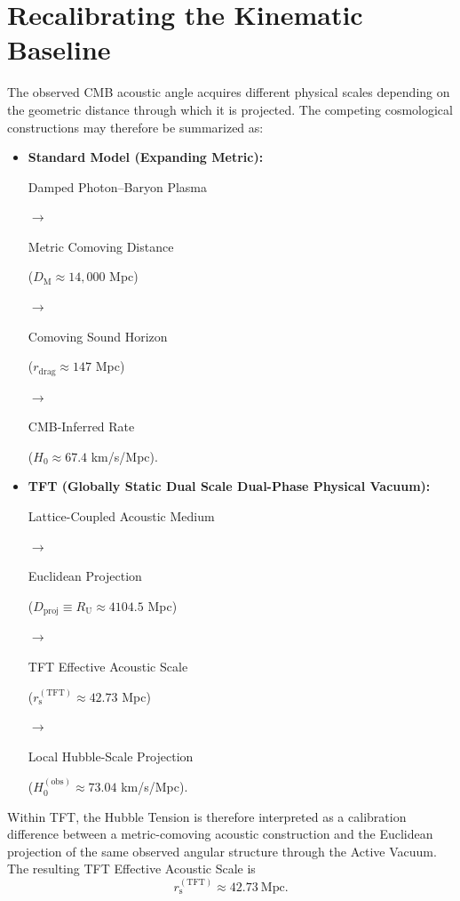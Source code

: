 \section{Recalibrating the Kinematic Baseline}
\label{sec:recalibrating_kinematic_baseline}

The observed CMB acoustic angle acquires different physical scales depending on the geometric distance through which it is projected. The competing cosmological constructions may therefore be summarized as:

\begin{itemize}

    \item \textbf{Standard Model (Expanding Metric):}

    Damped Photon--Baryon Plasma

    $\to$

    Metric Comoving Distance

    ($D_{\mathrm M} \approx 14{,}000$ Mpc)

    $\to$

    Comoving Sound Horizon

    ($r_{\mathrm{drag}} \approx 147$ Mpc)

    $\to$

    CMB-Inferred Rate

    ($H_0 \approx 67.4$ km/s/Mpc).

    \item \textbf{TFT (Globally Static Dual Scale Dual-Phase Physical Vacuum):}

    Lattice-Coupled Acoustic Medium

    $\to$

    Euclidean Projection

    ($D_{\mathrm{proj}}\equiv R_{\mathrm U}\approx4104.5$ Mpc)

    $\to$

    TFT Effective Acoustic Scale

    ($r_{\mathrm s}^{(\mathrm{TFT})}\approx42.73$ Mpc)

    $\to$

    Local Hubble-Scale Projection

    ($H_0^{(\mathrm{obs})}\approx73.04$ km/s/Mpc).

\end{itemize}

Within TFT, the Hubble Tension is therefore interpreted as a calibration difference between a metric-comoving acoustic construction and the Euclidean projection of the same observed angular structure through the Active Vacuum. The resulting TFT Effective Acoustic Scale is
\begin{equation}
    r_{\mathrm s}^{(\mathrm{TFT})}
    \approx
    42.73\ \mathrm{Mpc}.
\end{equation}

